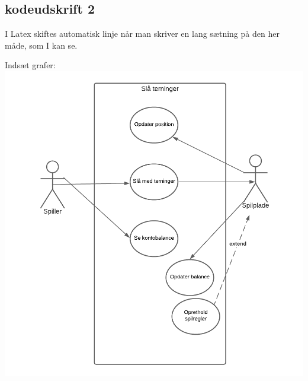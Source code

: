 \begin{flushleft} %

\subsection{kodeudskrift 2}

I Latex skiftes automatisk linje når man skriver en lang sætning på den her måde, som I kan se.

\addlinespace %

Indsæt grafer:
\includegraphics[width=1\textwidth]{Report/figures/Use case diagram CDIO del3.png}~\\[1cm]


\end{flushleft}